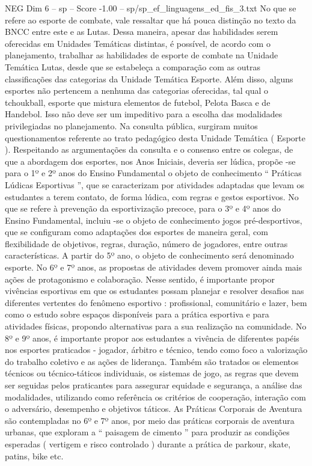 \begin{textsample}{NEG Dim 6 – sp – Score -1.00 – sp/sp\_ef\_linguagens\_ed\_fis\_3.txt}
No que se refere ao esporte de combate, vale ressaltar que há pouca distinção no texto da BNCC entre este e as Lutas.
Dessa maneira, apesar das habilidades serem oferecidas em Unidades Temáticas distintas, é possível, de acordo com o planejamento, trabalhar as habilidades de esporte de combate na Unidade Temática Lutas, desde que se estabeleça a comparação com as outras classificações das categorias da Unidade Temática Esporte.
Além disso, alguns esportes não pertencem a nenhuma das categorias oferecidas, tal qual o tchoukball, esporte que mistura elementos de futebol, Pelota Basca e de Handebol.
Isso não deve ser um impeditivo para a escolha das modalidades privilegiadas no planejamento.
Na consulta pública, surgiram muitos questionamentos referente ao trato pedagógico desta Unidade Temática ( Esporte ).
Respeitando as argumentações da consulta e o consenso entre os colegas, de que a abordagem dos esportes, nos Anos Iniciais, deveria ser lúdica, propõe -se para o 1º e 2º anos do Ensino Fundamental o objeto de conhecimento “ Práticas Lúdicas Esportivas ”, que se caracterizam por atividades adaptadas que levam os estudantes a terem contato, de forma lúdica, com regras e gestos esportivos.
No que se refere à prevenção da esportivização precoce, para o 3º e 4º anos do Ensino Fundamental, incluiu -se o objeto de conhecimento jogos pré-desportivos, que se configuram como adaptações dos esportes de maneira geral, com flexibilidade de objetivos, regras, duração, número de jogadores, entre outras características.
A partir do 5º ano, o objeto de conhecimento será denominado esporte.
No 6º e 7º anos, as propostas de atividades devem promover ainda mais ações de protagonismo e colaboração.
Nesse sentido, é importante propor vivências esportivas em que os estudantes possam planejar e resolver desafios nas diferentes vertentes do fenômeno esportivo : profissional, comunitário e lazer, bem como o estudo sobre espaços disponíveis para a prática esportiva e para atividades físicas, propondo alternativas para a sua realização na comunidade.
No 8º e 9º anos, é importante propor aos estudantes a vivência de diferentes papéis nos esportes praticados - jogador, árbitro e técnico, tendo como foco a valorização do trabalho coletivo e as ações de liderança.
Também são tratados os elementos técnicos ou técnico-táticos individuais, os sistemas de jogo, as regras que devem ser seguidas pelos praticantes para assegurar equidade e segurança, a análise das modalidades, utilizando como referência os critérios de cooperação, interação com o adversário, desempenho e objetivos táticos.
As Práticas Corporais de Aventura são contempladas no 6º e 7º anos, por meio das práticas corporais de aventura urbanas, que exploram a “ paisagem de cimento ” para produzir as condições esperadas ( vertigem e risco controlado ) durante a prática de parkour, skate, patins, bike etc.

\end{textsample}

